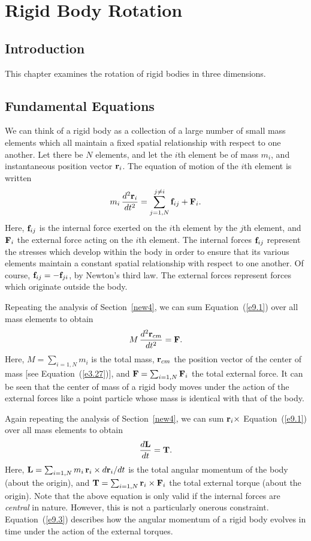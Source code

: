 \chapter{Rigid Body Rotation}\label{srigid}
\section{Introduction}
This chapter examines the rotation of rigid bodies in
three dimensions.

\section{Fundamental Equations}
We can think of a rigid body as a collection of a large number of small mass elements
which all maintain a fixed spatial relationship with respect to one another.
Let there be $N$ elements, and let the $i$th element be of mass $m_i$, and instantaneous position
vector ${\bf r}_i$. The equation of motion of the $i$th element
is written
\begin{eqnarray}\label{e9.1}
m_i\,\frac{d^2{\bf r}_i}{dt^2} = \sum_{j=1,N}^{j\neq i}
{\bf f}_{ij} + {\bf F}_i.
\end{eqnarray}
Here, ${\bf f}_{ij}$ is the internal force exerted on the $i$th  element by the
$j$th element, and ${\bf F}_i$  the external force acting on the $i$th
element. The internal forces ${\bf f}_{ij}$ represent the 
stresses which develop within the body in order to ensure that its various
elements maintain a constant spatial relationship with respect to one another.
Of course, ${\bf f}_{ij} = - {\bf f}_{ji}$, by Newton's third law.
The external forces represent forces which originate outside the body.

Repeating the analysis of Section~\ref{new4}, we can
sum Equation~(\ref{e9.1}) over all mass elements to obtain
\begin{equation}\label{e9.2}
M\,\frac{d^2{\bf r}_{cm}}{dt^2} = {\bf F}.
\end{equation}
Here,  $M=\sum_{i=1,N} m_i$ is the total mass, ${\bf r}_{cm}$ 
the position vector of the center of mass [see Equation~(\ref{e3.27})],
and ${\bf F}  = \sum_{i=1,N} {\bf F}_i$  the total external force.
It can be seen that the center of mass of a rigid body moves under the action of the external forces like
a point particle whose mass is identical with that of the body.

Again repeating the analysis of Section~\ref{new4}, we can sum ${\bf r}_i\times$ Equation~(\ref{e9.1}) over all mass elements to obtain
\begin{equation}\label{e9.3}
\frac{d{\bf L}}{dt} = {\bf T}.
\end{equation}
Here, ${\bf L}=\sum_{i=1,N} m_i\,{\bf r}_i\times d{\bf r}_i/dt$ is the
total angular momentum of the body (about the origin), and
${\bf T} = \sum_{i=1, N} {\bf r}_i\times{\bf F}_i$ the
total external torque (about the origin). Note that the above equation is
only valid if the internal forces are {\em central}\/ in nature. However, this
is not a particularly onerous constraint. Equation~(\ref{e9.3}) describes
how the angular momentum of a rigid body evolves in time under the action
of
the external torques.

